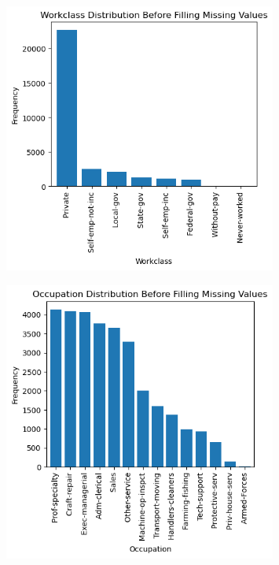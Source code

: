 \documentclass{article}
\begin{document}
    \begin{center}
        \begin{minipage}[t]{0.9\textwidth}
            \begin{figure}[H]
                \centering
                \includegraphics[width=0.8\textwidth, height=0.35\textheight]{./2_3ai.png}
            \end{figure}
            \begin{figure}[H]
                \centering
                \includegraphics[width=0.8\textwidth, height=0.35\textheight]{./2_3aii.png}
            \end{figure}
        \end{minipage}
    \end{center}
\end{document}

